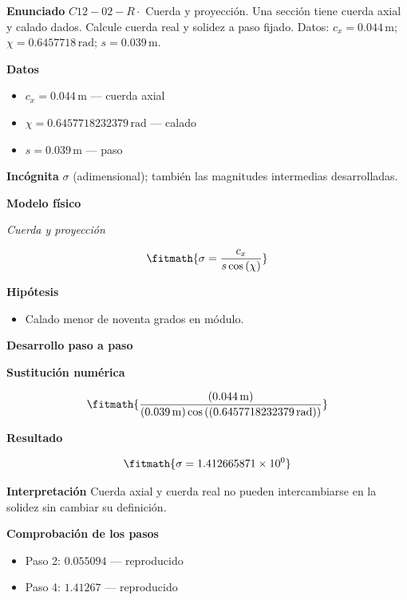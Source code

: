 \documentclass[10pt,openany]{book}
\begin{document}
\begin{tcolorbox}[title={Problema resuelto 2}, studiumworked, breakable]

\noindent\textbf{Enunciado}
\(C12-02-R \cdot\) Cuerda y proyección. Una sección tiene cuerda axial y calado dados. Calcule cuerda real y solidez a paso fijado. Datos: \(c_x=0.044\, \mathrm{m}\); \(\chi=0.6457718\, \mathrm{rad}\); \(s=0.039\, \mathrm{m}\).

\noindent\textbf{Datos}
\begin{itemize}
\item $c_x = 0.044\,\mathrm{m}$ — cuerda axial
\item $\chi = 0.6457718232379\,\mathrm{rad}$ — calado
\item $s = 0.039\,\mathrm{m}$ — paso
\end{itemize}

\noindent\textbf{Incógnita}
$\sigma$ (adimensional); también las magnitudes intermedias desarrolladas.

\noindent\textbf{Modelo físico}

\noindent\textit{Cuerda y proyección}

\[
\fitmath{\sigma=\frac{c_x}{s \cos{\left(\chi \right)}}}
\]

\noindent\textbf{Hipótesis}
\begin{itemize}
\item Calado menor de noventa grados en módulo.
\end{itemize}

\noindent\textbf{Desarrollo paso a paso}



\noindent\textbf{Sustitución numérica}

\[
\fitmath{\frac{\left(0.044\,\mathrm{m}\right)}{\left(0.039\,\mathrm{m}\right) \cos{\left(\left(0.6457718232379\,\mathrm{rad}\right) \right)}}}
\]

\noindent\textbf{Resultado}

\[
\fitmath{\sigma=1.412665871\times10^{0}}
\]

\noindent\textbf{Interpretación}
Cuerda axial y cuerda real no pueden intercambiarse en la solidez sin cambiar su definición.

\noindent\textbf{Comprobación de los pasos}
\begin{itemize}
\item Paso 2: $0.055094$ — reproducido
\item Paso 4: $1.41267$ — reproducido
\end{itemize}


\end{tcolorbox}
\end{document}
